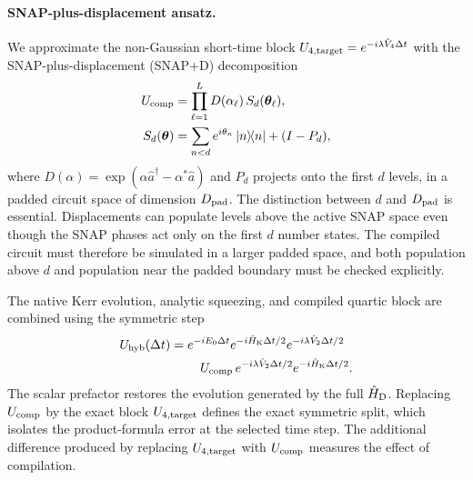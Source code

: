 \documentclass[pra,twocolumn,superscriptaddress,nofootinbib,floatfix]{revtex4-2}
\theoremstyle{remark}
\begin{document}
\paragraph{SNAP-plus-displacement ansatz.}
We approximate the non-Gaussian short-time block $U_{4,\rm target} = e^{-i\lambda\hat V_4\Delta t}$ with the SNAP-plus-displacement (SNAP+D) decomposition \cite{Krastanov_2015,Fosel2020SNAP,Kudra2022SNAPD}
\begin{align}
U_{\rm comp}&=\prod_{\ell=1}^{L}D(\alpha_\ell)\,S_d(\boldsymbol\theta_\ell),\nonumber\\
S_d(\boldsymbol\theta)&=\sum_{n<d}e^{i\theta_n}\ketbra{n}{n}+(I-P_d),
\label{eq:snapd-ansatz}
\end{align}
where \(D(\alpha)=\exp(\alpha\hat a^\dagger-\alpha^*\hat a)\) and \(P_d\) projects onto the first \(d\) levels, in a padded circuit space of dimension \(D_{\rm pad}\). The distinction between \(d\) and \(D_{\rm pad}\) is essential. Displacements can populate levels above the active SNAP space even though the SNAP phases act only on the first \(d\) number states. The compiled circuit must therefore be simulated in a larger padded space, and both population above \(d\) and population near the padded boundary must be checked explicitly.

The native Kerr evolution, analytic squeezing, and compiled quartic block are combined using the symmetric step \cite{Strang1968}
\begin{align}
U_{\rm hyb}(\Delta t) ={}& e^{-iE_0\Delta t}e^{-i\hat H_{\rm K}\Delta t/2}e^{-i\lambda\hat V_2\Delta t/2}\nonumber\\
&\quad U_{\rm comp}\,e^{-i\lambda\hat V_2\Delta t/2}e^{-i\hat H_{\rm K}\Delta t/2}.
\label{eq:df-hybrid-step}
\end{align}
The scalar prefactor restores the evolution generated by the full \(\hat H_{\rm D}\).
Replacing \(U_{\rm comp}\) by the exact block \(U_{4,\rm target}\) defines the exact symmetric split, which isolates the product-formula error at the selected time step. The additional difference produced by replacing \(U_{4,\rm target}\) with \(U_{\rm comp}\) measures the effect of compilation.
\end{document}
